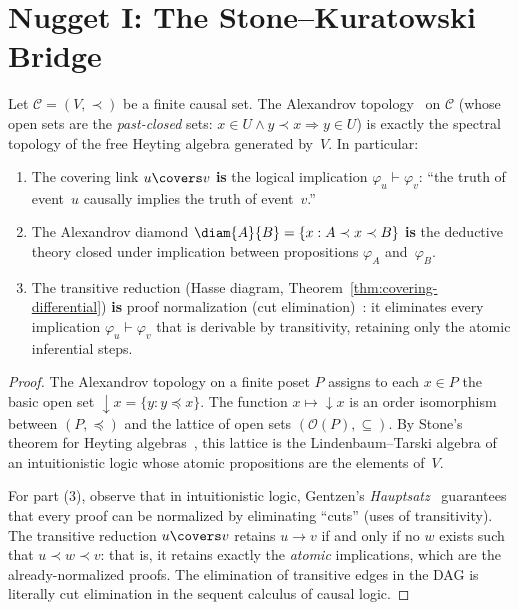 \section{Nugget I: The Stone--Kuratowski Bridge}

\begin{theorem}
\label{thm:stone-kuratowski}
Let $\mathcal{C} = (V, \prec)$ be a finite causal set. The
Alexandrov topology~\cite{sorkin1991topology} on $\mathcal{C}$
(whose open sets are the \emph{past-closed} sets:
$x \in U \wedge y \prec x \Rightarrow y \in U$) is exactly the
spectral topology of the free Heyting algebra generated by~$V$.
In particular:

\begin{enumerate}
  \item The covering link $u \covers v$ \textbf{is} the
    logical implication $\varphi_u \vdash \varphi_v$: ``the truth
    of event~$u$ causally implies the truth of event~$v$.''
  \item The Alexandrov diamond $\diam{A}{B} = \{x : A \prec x
    \prec B\}$ \textbf{is} the deductive theory closed under
    implication between propositions $\varphi_A$ and~$\varphi_B$.
  \item The transitive reduction (Hasse diagram,
    Theorem~\ref{thm:covering-differential}) \textbf{is}
    proof normalization (cut
    elimination)~\cite{gentzen1935}: it eliminates every implication
    $\varphi_u \vdash \varphi_v$ that is derivable by
    transitivity, retaining only the atomic inferential
    steps.
\end{enumerate}
\end{theorem}

\begin{proof}
The Alexandrov topology on a finite poset $P$ assigns to each
$x \in P$ the basic open set $\downarrow\!x = \{y : y \preceq x\}$.
The function $x \mapsto \downarrow\!x$ is an order isomorphism
between $(P, \preceq)$ and the lattice of open sets $(\mathcal{O}(P),
\subseteq)$. By Stone's theorem for Heyting
algebras~\cite{stone1937,vickers1989}, this lattice is the
Lindenbaum--Tarski algebra of an intuitionistic logic whose
atomic propositions are the elements of~$V$.

For part (3), observe that in intuitionistic logic, Gentzen's
\emph{Hauptsatz}~\cite{gentzen1935} guarantees that every
proof can be normalized by eliminating ``cuts'' (uses of
transitivity). The transitive reduction $u \covers v$ retains
$u \to v$ if and only if no $w$ exists such that $u \prec w \prec v$:
that is, it retains exactly the \emph{atomic} implications, which
are the already-normalized proofs. The elimination of transitive
edges in the DAG is literally cut elimination in the
sequent calculus of causal logic.
\end{proof}

